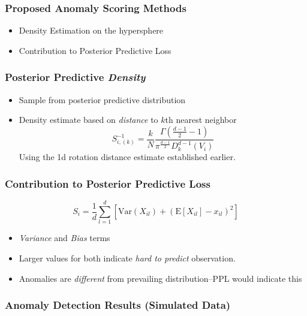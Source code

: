 \documentclass[aspectratio=169]{beamer}
\begin{document}
\begin{frame}
  \frametitle{Proposed Anomaly Scoring Methods}
  \begin{itemize}
    \item Density Estimation on the hypersphere
    \item Contribution to Posterior Predictive Loss
  \end{itemize}
\end{frame}

\begin{frame}
  \frametitle{Posterior Predictive \emph{Density}}
  \begin{itemize}
    \item Sample from posterior predictive distribution
    \item Density estimate based on \emph{distance} to $k$th nearest neighbor
    \begin{equation*}
        S_{i,(k)}^{-1} =
          \frac{k}{N}\frac{\Gamma\left(\frac{d-1}{2} - 1\right)}{\pi^{\frac{d-1}{2}}D_{k}^{d-1}(V_i)}
    \end{equation*}
    Using the 1d rotation distance estimate established earlier.
  \end{itemize}
\end{frame}

\begin{frame}
    \frametitle{Contribution to Posterior Predictive Loss}
    \begin{equation*}
         S_{i} = \frac{1}{d}\sum_{l = 1}^{d}\left[\text{Var}(X_{il}) +
                        \left(\text{E}[X_{il}] - x_{il}\right)^2\right]
    \end{equation*}
    \begin{itemize}
        \item \emph{Variance} and \emph{Bias} terms
        \item Larger values for both indicate \emph{hard to predict} observation.
        \item Anomalies are \emph{different} from prevailing distribution--PPL would indicate this
    \end{itemize}
\end{frame}

\begin{frame}
  \frametitle{Anomaly Detection Results (Simulated Data)}
  \begin{center}
    
  \end{center}
\end{frame}
\end{document}
